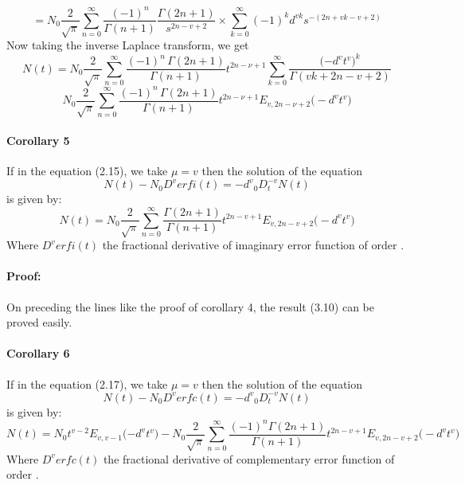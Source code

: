 \documentclass{article}
\begin{document}
\begin{equation*}
    = N_0
    {\frac{2}{\sqrt{\pi}}}
    \sum_{n = 0}^{\infty}
    \frac{(-1)^n}{\Gamma{(n+1)}}
    \frac{\Gamma{(2n+1)}}{s^{2n- v +2}}
    \times
    \sum_{k=0}^{\infty}
    {(-1)^k}{d^{vk}}{s^{-(2n+vk-v+2)}}
\end{equation*}
Now taking the inverse Laplace transform, we get 
\begin{equation*}
    N(t) = N_0
    {\frac{2}{\sqrt{\pi}}}
    \sum_{n = 0}^{\infty}
    \frac{(-1)^n\,{\Gamma{(2n+1)}}}{\Gamma{(n+1)}}t^{2n-{\nu}+1}
    \sum_{k=0}^{\infty}
    \frac{\big({-d^v}{t^v}\big)^k}{\Gamma{(vk+2n-v+2)}}
\end{equation*}
\begin{equation*}
    N_0
    {\frac{2}{\sqrt{\pi}}}
    \sum_{n = 0}^{\infty}
    \frac{(-1)^n\,{\Gamma{(2n+1)}}}{\Gamma{(n+1)}}
    t^{2n-{\nu}+1}
    E_{v, 2n-{\nu}+2}
    \big(-{d^v}{t^v})
\end{equation*}

\paragraph{Corollary 5}
If in the equation (2.15), we take $\mu = v$ then the solution of the equation
\begin{equation}
    N(t) -{N_0}{D^v}erfi(t)= {-d^v}{_0D_t^{-v}}N(t)
\end{equation}
is given by:
\begin{equation}
    N(t) =
    N_0{\frac{2}{\sqrt{\pi}}}
    \sum_{n = 0}^{\infty}
    \frac{\Gamma{(2n+1)}}{\Gamma{(n+1)}}
    t^{2n-{v}+1}
    E_{v, 2n-{v}+2}
    \big(-{d^v}{t^v})
\end{equation}
Where ${D^v}erfi(t)$ the fractional derivative of imaginary error function of order \nu.
\paragraph{Proof:}
On preceding the lines like the proof of corollary 4, the result (3.10) can be proved easily.
\paragraph{Corollary 6}
If in the equation (2.17), we take $\mu = v$ then the solution of the equation
\begin{equation}
    N(t) -{N_0}{D^v}erfc(t)= {-d^v}{_0D_t^{-v}}N(t)
\end{equation}
is given by:
\begin{equation}
    N(t) =
    {N_0}{t^{v-2}}
    E_{v,{v-1}}
    {\big({-d^v}{t^v}\big)}
    -N_0{\frac{2}{\sqrt{\pi}}}
    \sum_{n = 0}^{\infty}
    \frac{{(-1)^n}\Gamma{(2n+1)}}{\Gamma{(n+1)}}
    t^{2n-{v}+1}
    E_{v, 2n-{v}+2}
    \big(-{d^v}{t^v})
\end{equation}
Where ${D^v}erfc(t)$ the fractional derivative of complementary error function of order \nu.
\end{document}
